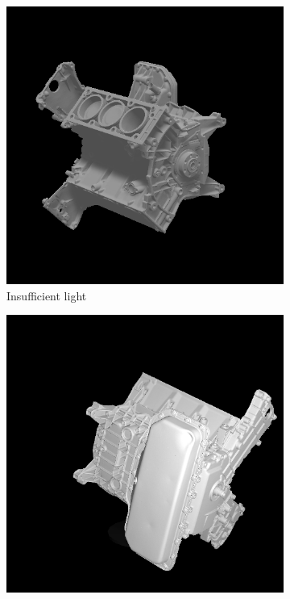 \begin{figure}[H]
	\centering
	\captionsetup{width=\linewidth}
	\begin{subfigure}[b]{0.32\linewidth}
		\includegraphics[width=\textwidth]{./Figures/wrong_exposure_2.png}
		\caption{Insufficient light}
	\end{subfigure}
	\begin{subfigure}[b]{0.32\linewidth}
		\includegraphics[width=\textwidth]{./Figures/right_exposure.png}

\end{subfigure}
\end{figure}
